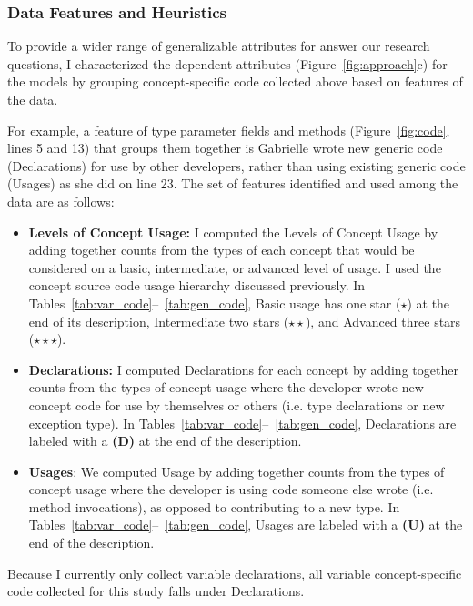 \subsubsection{Data Features and Heuristics}\label{subsec:prep}

To provide a wider range of generalizable attributes for answer our research questions, I characterized the dependent attributes (Figure~\ref{fig:approach}c) for the models by grouping concept-specific code collected above based on features of the data. 

For example, a feature of type parameter fields and methods (Figure~\ref{fig:code}, lines 5 and 13) that groups them together is Gabrielle wrote new generic code (Declarations) for use by other developers, rather than using existing generic code (Usages) as she did on line 23.
The set of features identified and used among the data are as follows:
\begin{itemize}
	\item \textbf{Levels of Concept Usage:} I computed the Levels of Concept Usage by adding together counts from the types of each concept that would be considered on a basic, intermediate, or advanced level of usage. I used the concept source code usage hierarchy discussed previously. 
	In Tables~\ref{tab:var_code}--~\ref{tab:gen_code}, Basic usage has one star (\textbf{$\star$}) at the end of its description, Intermediate two stars (\textbf{$\star\star$}), and Advanced three stars (\textbf{$\star\star\star$}).
	\item \textbf{Declarations:} I computed Declarations for each concept by adding together counts from the types of concept usage where the developer wrote new concept code for use by themselves or others (i.e. type declarations or new exception type). In Tables~\ref{tab:var_code}--~\ref{tab:gen_code}, Declarations are labeled with a \textbf{(D)} at the end of the description.
	\item \textbf{Usages}: We computed Usage by adding together counts from the types of concept usage where the developer is using code someone else wrote (i.e. method invocations), as opposed to contributing to a new type. In Tables~\ref{tab:var_code}--~\ref{tab:gen_code}, Usages are labeled with a \textbf{(U)} at the end of the description.
\end{itemize}

Because I currently only collect variable declarations, all variable concept-specific code collected for this study falls under Declarations.

